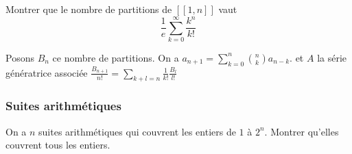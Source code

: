 \begin{exo}
Montrer que le nombre de partitions de $[\![1, n]\!]$ vaut
$$\frac 1e \sum_{k=0}^\infty \frac{k^n}{k!} $$
\end{exo}
\begin{sol}
Posons $B_n$ ce nombre de partitions. On a $a_{n+1} = \sum_{k=0}^n {n \choose k} a_{n - k}$. et $A$ la série génératrice associée
$\frac{B_{n+1}}{n!} = \sum_{k+l=n} \frac 1{k!}\frac{B_l}{l!}$
\end{sol}

\subsubsection{Suites arithmétiques}

\begin{exo}
On a $n$ suites arithmétiques qui couvrent les entiers de $1$ à $2^n$. Montrer qu'elles couvrent tous les entiers.
\end{exo}

